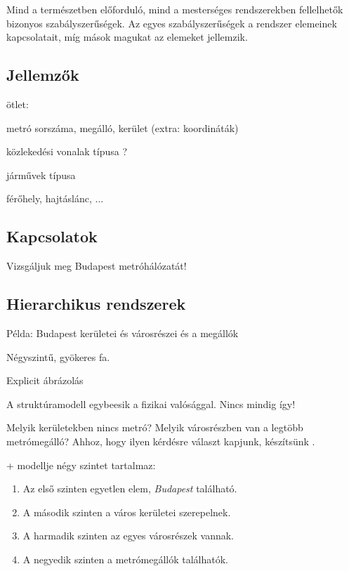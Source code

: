 Mind a természetben előforduló, mind a mesterséges rendszerekben fellelhetők bizonyos szabályszerűségek. Az egyes szabályszerűségek a rendszer elemeinek kapcsolatait, míg mások magukat az elemeket jellemzik.

\subsection{Jellemzők}

ötlet:

metró sorszáma, megálló, kerület (extra: koordináták)

közlekedési vonalak típusa ?

járművek típusa

férőhely, hajtáslánc, ...

\subsection{Kapcsolatok}


\begin{pelda}
	Vizsgáljuk meg Budapest metróhálózatát!
	
\end{pelda}

\subsection{Hierarchikus rendszerek}

Példa: Budapest kerületei és városrészei és a megállók %

Négyszintű, gyökeres fa.

Explicit ábrázolás

A struktúramodell egybeesik a fizikai valósággal. Nincs mindig így!

\begin{pelda}
	Melyik kerületekben nincs metró? Melyik városrészben van a legtöbb metrómegálló? Ahhoz, hogy ilyen kérdésre választ kapjunk, készítsünk .
	
	
	\Az+ modellje négy szintet tartalmaz:
	
	\begin{enumerate}
		\item Az első szinten egyetlen elem, \emph{Budapest} található.
		\item A második szinten a város kerületei szerepelnek.	
		\item A harmadik szinten az egyes városrészek vannak.
		\item A negyedik szinten a metrómegállók találhatók.
	\end{enumerate}
\end{pelda}

